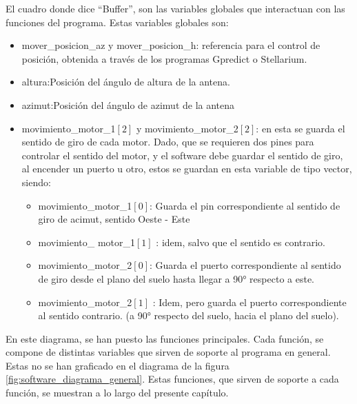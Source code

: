 El cuadro donde dice ``Buffer'', son las variables globales que interactuan con las funciones del programa. Estas variables globales son: 
\begin{itemize}
	\item mover\_posicion\_az y mover\_posicion\_h: referencia para el control de posición, obtenida a través de los programas Gpredict o Stellarium.  
	\item altura:Posición del ángulo de altura de la antena. 
	\item azimut:Posición del ángulo de azimut de la antena
	\item movimiento\_motor\_1$[2]$  y movimiento\_motor\_2$[2]$: en esta se guarda el sentido de giro de cada motor. Dado, que se requieren dos pines para controlar el sentido del motor, y el software debe guardar el sentido de giro, al encender un puerto u otro, estos se guardan en esta variable de tipo vector, siendo: 
		\begin{itemize}
			\item movimiento\_motor\_1$[0]$: Guarda el pin correspondiente al sentido de giro de acimut, sentido Oeste - Este 
			\item movimiento\_ motor\_1$[1]$ : idem, salvo que el sentido es contrario.  
			\item movimiento\_motor\_2$[0]$: Guarda el puerto correspondiente al sentido de giro desde el plano del suelo hasta llegar a 90° respecto a este. 
			\item movimiento\_motor\_2$[1]$ : Idem, pero guarda el puerto correspondiente al sentido contrario. (a 90° respecto del suelo, hacia el plano del suelo). 			
		\end{itemize}
	
\end{itemize}  



En este diagrama, se han puesto las funciones principales. Cada función, se compone de distintas variables que sirven de soporte al programa en general. Estas no se han graficado en el diagrama de la figura \ref{fig:software_diagrama_general}. Estas funciones, que sirven de soporte a cada función, se muestran a lo largo del presente capítulo. 


%

